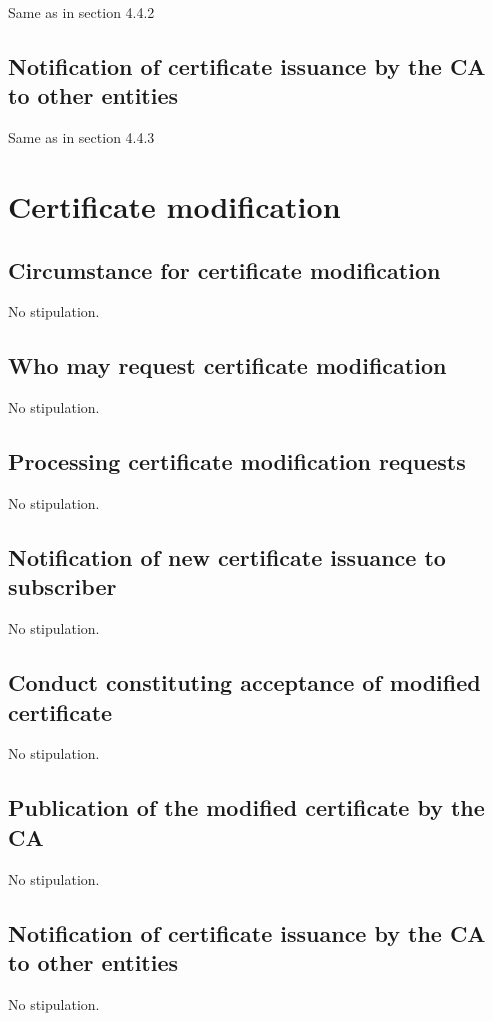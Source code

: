 \documentclass[11pt,a4paper,titlepage]{book}
\begin{document}
Same as in section 4.4.2

\subsection{Notification of certificate issuance by the CA to other entities}

Same as in section 4.4.3

\section{Certificate modification}



\subsection{Circumstance for certificate modification}

No stipulation.

\subsection{Who may request certificate modification}

No stipulation.

\subsection{Processing certificate modification requests}

No stipulation.

\subsection{Notification of new certificate issuance to subscriber}
No stipulation.

\subsection{Conduct constituting acceptance of modified certificate}
No stipulation.

\subsection{Publication of the modified certificate by the CA}
No stipulation.

\subsection{Notification of certificate issuance by the CA to other entities}
No stipulation.
\end{document}
